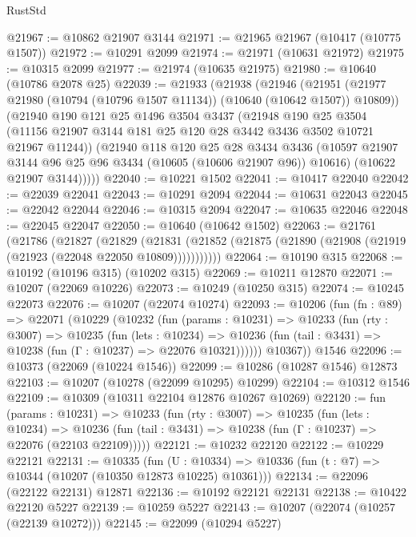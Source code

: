 \begin{lexlean}{RustStd}
\begin{coremodule}
@21967 := @10862 @21907 @3144
@21971 := @21965 @21967 (@10417 (@10775 @1507))
@21972 := @10291 @2099
@21974 := @21971 (@10631 @21972)
@21975 := @10315 @2099
@21977 := @21974 (@10635 @21975)
@21980 := @10640 (@10786 @2078 @25)
@22039 := @21933
    (@21938
      (@21946
        (@21951 (@21977 @21980 (@10794 (@10796 @1507 @11134)) (@10640 (@10642 @1507)) @10809))
        (@21940
          @190
          @121
          @25
          @1496
          @3504
          @3437
          (@21948
            @190
            @25
            @3504
            (@11156 @21907 @3144 @181 @25 @120 @28 @3442 @3436 @3502 @10721 @21967 @11244))
          (@21940
            @118
            @120
            @25
            @28
            @3434
            @3436
            (@10597 @21907 @3144 @96 @25 @96 @3434 (@10605 (@10606 @21907 @96)) @10616)
            (@10622 @21907 @3144)))))
@22040 := @10221 @1502
@22041 := @10417 @22040
@22042 := @22039 @22041
@22043 := @10291 @2094
@22044 := @10631 @22043
@22045 := @22042 @22044
@22046 := @10315 @2094
@22047 := @10635 @22046
@22048 := @22045 @22047
@22050 := @10640 (@10642 @1502)
@22063 := @21761
    (@21786
      (@21827
        (@21829
          (@21831 (@21852 (@21875 (@21890 (@21908 (@21919 (@21923 (@22048 @22050 @10809)))))))))))
@22064 := @10190 @315
@22068 := @10192 (@10196 @315) (@10202 @315)
@22069 := @10211 @12870
@22071 := @10207 (@22069 @10226)
@22073 := @10249 (@10250 @315)
@22074 := @10245 @22073
@22076 := @10207 (@22074 @10274)
@22093 := @10206
    (fun (fn : @89) =>
    @22071
      (@10229
        (@10232
          (fun (params : @10231) =>
          @10233
            (fun (rty : @3007) =>
            @10235
              (fun (lets : @10234) =>
              @10236 (fun (tail : @3431) => @10238 (fun (Γ : @10237) => @22076 @10321))))))
        @10367))
    @1546
@22096 := @10373 (@22069 (@10224 @1546))
@22099 := @10286 (@10287 @1546) @12873
@22103 := @10207 (@10278 (@22099 @10295) @10299)
@22104 := @10312 @1546
@22109 := @10309 (@10311 @22104 @12876 @10267 @10269)
@22120 := fun (params : @10231) =>
  @10233
    (fun (rty : @3007) =>
    @10235
      (fun (lets : @10234) =>
      @10236 (fun (tail : @3431) => @10238 (fun (Γ : @10237) => @22076 (@22103 @22109)))))
@22121 := @10232 @22120
@22122 := @10229 @22121
@22131 := @10335
    (fun (U : @10334) => @10336 (fun (t : @7) => @10344 (@10207 (@10350 @12873 @10225) @10361)))
@22134 := @22096 (@22122 @22131) @12871
@22136 := @10192 @22121 @22131
@22138 := @10422 @22120 @5227
@22139 := @10259 @5227
@22143 := @10207 (@22074 (@10257 (@22139 @10272)))
@22145 := @22099 (@10294 @5227)

\end{coremodule}
\end{lexlean}
